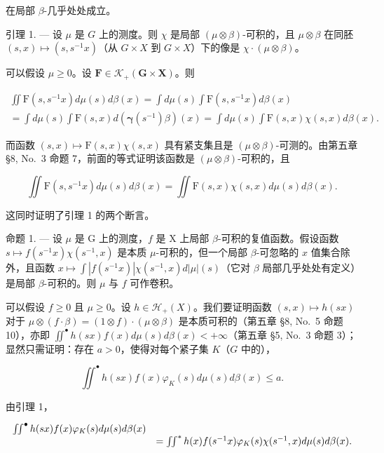 在局部 \(\beta\)-几乎处处成立。

引理 1. --- 设 \(\mu\) 是 \(G\) 上的测度。则 \(\chi\) 是局部 \((\mu \otimes \beta)\)-可积的，且 \(\mu \otimes \beta\) 在同胚 \((s, x) \mapsto (s, s^{-1}x)\)（从 \(G \times X\) 到 \(G \times X\)）下的像是 \(\chi \cdot (\mu \otimes \beta)\)。

可以假设 \(\mu \geqslant 0\)。设 \(\mathbf{F} \in \mathcal{K}_{+}(\mathbf{G} \times \mathbf{X})\)。则

\[
\begin{array}{l} \iint \mathrm{F} (s, s ^ {- 1} x) d \mu (s) d \beta (x) = \int d \mu (s) \int \mathrm{F} (s, s ^ {- 1} x) d \beta (x) \\ = \int d \mu (s) \int \mathrm{F} (s, x) d (\boldsymbol {\gamma} (s ^ {- 1}) \beta) (x) = \int d \mu (s) \int \mathrm{F} (s, x) \chi (s, x) d \beta (x). \end{array}
\]

而函数 \((s,x)\mapsto\mathrm{F}(s,x)\chi(s,x)\) 具有紧支集且是 \((\mu\otimes\beta)\)-可测的。由第五章 §8, No.~3 命题 7，前面的等式证明该函数是 \((\mu\otimes\beta)\)-可积的，且

\[
\iint \mathrm{F} (s, s ^ {- 1} x) d \mu (s) d \beta (x) = \iint \mathrm{F} (s, x) \chi (s, x) d \mu (s) d \beta (x).
\]

这同时证明了引理 1 的两个断言。

命题 1. --- 设 \(\mu\) 是 G 上的测度，\(f\) 是 X 上局部 \(\beta\)-可积的复值函数。假设函数 \(s \mapsto f(s^{-1}x)\chi(s^{-1}, x)\) 是本质 \(\mu\)-可积的，但一个局部 \(\beta\)-可忽略的 \(x\) 值集合除外，且函数 \(x \mapsto \int |f(s^{-1}x)| \chi(s^{-1}, x) d|\mu|(s)\)（它对 \(\beta\) 局部几乎处处有定义）是局部 \(\beta\)-可积的。则 \(\mu\) 与 \(f\) 可作卷积。

可以假设 \(f \geqslant 0\) 且 \(\mu \geqslant 0\)。设 \(h \in \mathcal{H}_{+}(X)\)。我们要证明函数 \((s, x) \mapsto h(sx)\) 对于 \(\mu \otimes (f \cdot \beta) = (1 \otimes f) \cdot (\mu \otimes \beta)\) 是本质可积的（第五章 §8, No.~5 命题 10），亦即 \(\iint^{\bullet} h(sx)f(x)d\mu(s)d\beta(x) < +\infty\)（第五章 §5, No.~3 命题 3）；显然只需证明：存在 \(a > 0\)，使得对每个紧子集 \(K\)（\(G\) 中的），

\[
\iint^ {\bullet} h (s x) f (x) \varphi_ {K} (s) d \mu (s) d \beta (x) \leqslant a.
\]

由引理 1，

\[
\begin{array}{r l} \iint^ {\bullet} h (s x) f (x) \varphi_ {K} (s) d \mu (s) d \beta (x) \\ & = \iint^ {*} h (x) f (s ^ {- 1} x) \varphi_ {K} (s) \chi (s ^ {- 1}, x) d \mu (s) d \beta (x). \end{array}
\]

